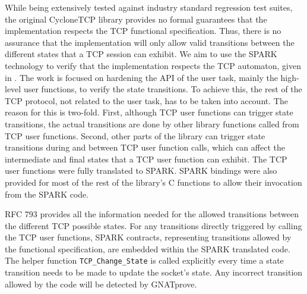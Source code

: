 \documentclass[conference]{IEEEtran}
\begin{document}
While being extensively tested against industry standard regression test suites, the original CycloneTCP library provides no formal guarantees that the implementation respects the TCP functional specification. Thus, there is no assurance that the implementation will only allow valid transitions between the different states that a TCP session can exhibit. We aim to use the SPARK technology to verify that the implementation respects the TCP automaton, given in . The work is focused on hardening the API of the user task, mainly the high-level user functions, to verify the state transitions. To achieve this, the rest of the TCP protocol, not related to the user task, has to be taken into account. The reason for this is two-fold. First, although TCP user functions can trigger state transitions, the actual transitions are done by other library functions called from TCP user functions. Second, other parts of the library can trigger state transitions during and between TCP user function calls, which can affect the intermediate and final states that a TCP user function can exhibit. The TCP user functions were fully translated to SPARK. SPARK bindings were also provided for most of the rest of the library's C functions to allow their invocation from the SPARK code.

RFC 793 provides all the information needed for the allowed transitions between the different TCP possible states. For any transitions directly triggered by calling the TCP user functions, SPARK contracts, representing transitions allowed by the functional specification, are embedded within the SPARK translated code. The helper function \texttt{TCP\_Change\_State} is called explicitly every time a state transition needs to be made to update the socket's state. Any incorrect transition allowed by the code will be detected by GNATprove.



%
\end{document}
